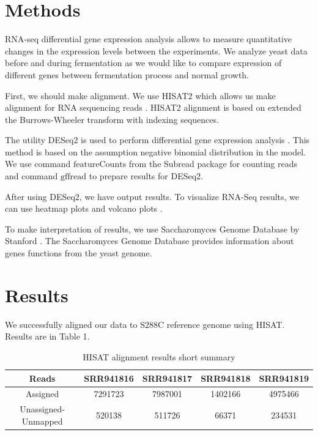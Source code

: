\documentclass{article}
\begin{document}
\section{Methods}
 RNA-seq differential gene expression analysis allows to measure  quantitative changes in the expression levels between the experiments.  We analyze yeast data before and during fermentation as we would like to compare expression of  different genes between  fermentation process and normal growth. 
 
 First, we should make alignment. We use HISAT2 which allows us make  alignment  for RNA sequencing reads \cite{hisat}. HISAT2 alignment is based on extended the Burrows-Wheeler transform  with indexing sequences. 
 
 The utility DESeq2 is used to perform differential gene expression analysis \cite{deseq}. This method is based on the assumption  negative binomial distribution in the model. We use command $\textrm{featureCounts}$ from the Subread package \cite{featurecounts} for counting reads and command $\textrm{gffread}$ \cite{gff} to prepare results for DESeq2. 
 
 After using DESeq2, we have output results. To visualize RNA-Seq results, we can use heatmap plots and volcano plots \cite{volcano}.   
 
   To make interpretation of results, we use Saccharomyces Genome Database  by Stanford \cite{ontology}. The Saccharomyces Genome Database provides information about genes functions  from the yeast genome. 
 
 
 \section{Results}
 
 	We successfully aligned  our data to S288C reference genome using HISAT. Results are in Table 1.
 
 
 	\begin{table}[h!]
 	\centering
 	\begin{tabular}{|c|c|c|c|c|}
 		\hline
 		Reads & SRR941816& SRR941817 & SRR941818 & SRR941819  \\
 		\hline
 	 Assigned	& 7291723&	7987001	&1402166	& 4975466 \\
 		\hline
 		 Unassigned-Unmapped &	520138 & 	511726&	66371	& 234531\\
 		\hline
  
 	\end{tabular}
 	\caption{  HISAT alignment results short summary }
 	\label{tab:2}
 \end{table}
 
\end{document}
